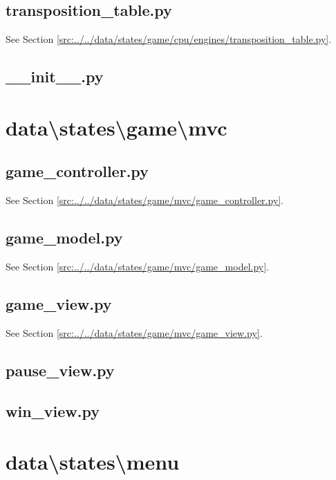 \documentclass[../main/main.tex]{subfiles}
\begin{document}
\subsection{transposition\_table.py}
See Section \ref{src:../../data/states/game/cpu/engines/transposition_table.py}.

\subsection{\_\_init\_\_.py}

\label{src:data/states/game/cpu/engines/__init__.py}

\section{data\textbackslash states\textbackslash game\textbackslash mvc}
\subsection{game\_controller.py}
See Section \ref{src:../../data/states/game/mvc/game_controller.py}.

\subsection{game\_model.py}
See Section \ref{src:../../data/states/game/mvc/game_model.py}.

\subsection{game\_view.py}
See Section \ref{src:../../data/states/game/mvc/game_view.py}.

\subsection{pause\_view.py}

\label{src:data/states/game/mvc/pause_view.py}

\subsection{win\_view.py}

\label{src:data/states/game/mvc/win_view.py}

\section{data\textbackslash states\textbackslash menu}
\end{document}
